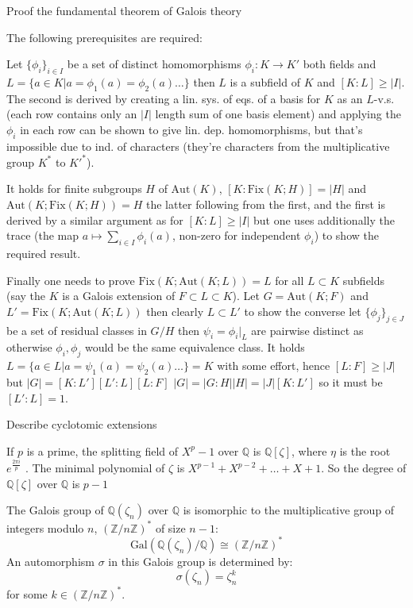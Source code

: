 Proof the fundamental theorem of Galois theory

The following prerequisites are required:

Let \(\{\phi_i\}_{i \in I}\) be a set of distinct homomorphisms \(\phi_i : K \to K'\) both fields
and \(L = \{ a \in K | a = \phi_1(a) = \phi_2(a) \dots \}\) then \(L\) is a subfield of \(K\) and \([K : L] \geq |I|\).
The second is derived by creating a lin. sys. of eqs. of a basis for \(K\) as an \(L\)-v.s.
(each row contains only an \(|I|\) length sum of one basis element) and applying the \(\phi_i\) in each row
can be shown to give lin. dep. homomorphisms, but that's impossible due to ind. of characters (they're characters
from the multiplicative group \(K^{*}\) to \(K'^{*}\)).

It holds for finite subgroups \(H\) of \(\text{Aut}(K)\), \([K:\text{Fix}(K;H)] = |H|\) and \(\text{Aut}(K;\text{Fix}(K;H)) = H\) 
the latter following from the first, and the first is derived by a similar argument as for \([K : L] \geq |I|\) but one uses additionally 
the trace (the map \(a \mapsto \sum_{i \in I} \phi_i(a)\), non-zero for independent \(\phi_i\)) to show the required result.

Finally one needs to prove
\(\text{Fix}(K;\text{Aut}(K;L)) = L\) for all \(L \subset K\) subfields (say the \(K\) is a Galois extension of \(F \subset L \subset K\)).
Let \(G = \text{Aut}(K;F)\) and \(L' = \text{Fix}(K;\text{Aut}(K;L))\) then clearly \(L \subset L'\) to show the converse let \(\{\phi_j\}_{j \in J}\)
be a set of residual classes in \(G/H\) then \(\psi_i = \phi_i |_{L}\) are pairwise distinct as otherwise \(\phi_i, \phi_j\) would be the same equivalence class.
It holds \(L = \{ a \in L | a = \psi_1(a) = \psi_2(a) \dots \} = K\) with some effort, hence \([L : F] \geq |J|\) but
\(|G| = [K : L'][L' : L][L : F]\)
\(|G| = |G : H||H| = |J|[K : L']\) so it must be \([L' : L] = 1\).


Describe cyclotomic extensions

If \(p\) is a prime, the splitting field of \(X^p − 1\) over \(\mathbb{Q}\) is \(\mathbb{Q}[\zeta]\), where \(\eta\) is the root \(e^{\frac{2\pi i}{p}}\) . The
minimal polynomial of \(\zeta\) is \(X^{p−1} + X^{p−2} + \dots + X + 1\). So the degree of \(\mathbb{Q}[\zeta]\) over \(\mathbb{Q}\) is \(p − 1\)

The Galois group of \(\mathbb{Q}(\zeta_n)\) over \(\mathbb{Q}\) is isomorphic to the multiplicative group of integers modulo \( n \), \((\mathbb{Z}/n\mathbb{Z})^*\) of size \(n-1\):
\[ \text{Gal}(\mathbb{Q}(\zeta_n)/\mathbb{Q}) \cong (\mathbb{Z}/n\mathbb{Z})^* \]
An automorphism \(\sigma\) in this Galois group is determined by:
\[ \sigma(\zeta_n) = \zeta_n^k \]
for some \( k \in (\mathbb{Z}/n\mathbb{Z})^* \).

